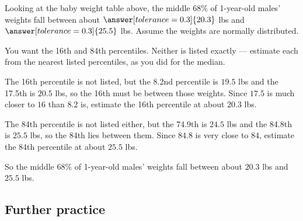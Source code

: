 \documentclass[12pt]{ximera}
\begin{document}
\begin{problem}
Looking at the baby weight table above, the middle $68\%$ of 1-year-old males'
weights fall between about $\answer[tolerance=0.3]{20.3}$ lbs and
$\answer[tolerance=0.3]{25.5}$ lbs. Assume the weights are normally distributed.

\begin{hint}
You want the 16th and 84th percentiles. Neither is listed exactly --- estimate each
from the nearest listed percentiles, as you did for the median.
\end{hint}

\begin{solution}
The 16th percentile is not listed, but the 8.2nd percentile is $19.5$ lbs and the
17.5th is $20.5$ lbs, so the 16th must be between those weights. Since $17.5$ is much
closer to $16$ than $8.2$ is, estimate the 16th percentile at about $20.3$ lbs.

The 84th percentile is not listed either, but the 74.9th is $24.5$ lbs and the 84.8th
is $25.5$ lbs, so the 84th lies between them. Since $84.8$ is very close to $84$,
estimate the 84th percentile at about $25.5$ lbs.

So the middle $68\%$ of 1-year-old males' weights fall between about $20.3$ lbs and
$25.5$ lbs.
\end{solution}
\end{problem}

\subsection*{Further practice}
\end{document}
